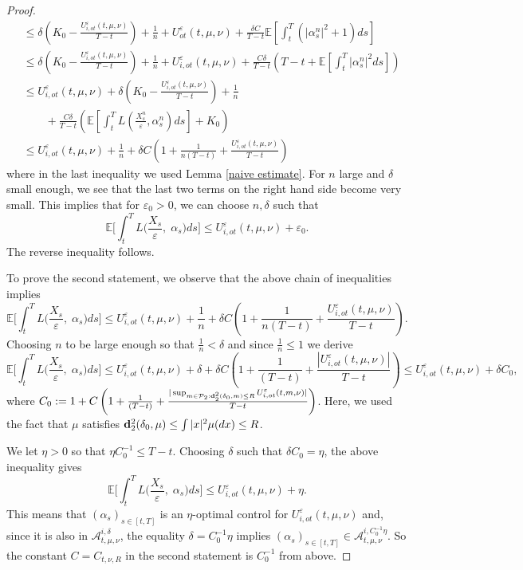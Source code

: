 \documentclass[reqno,11pt]{amsart}
\numberwithin{equation}{section}
\newcommand{\e}{\varepsilon}
\newcommand{\nd}{\noindent}
\begin{document}
\begin{proof}
\begin{align*}
        &\le \delta \left(K_0-\frac{U_{i,ot}^\e(t,\mu,\nu)}{T-t}\right)+\frac{1}{n}+U_{ot}^\e(t,\mu,\nu) +\frac{\delta C}{T-t}\mathbb{E}\left[ \int_t^T(|\alpha_s^n|^2+1)ds\right]\\
        &\le\delta \left(K_0-\frac{U_{i,ot}^\e(t,\mu,\nu)}{T-t}\right)+\frac{1}{n}+U_{i,ot}^\e(t,\mu,\nu) +\frac{C\delta}{T-t}\left(T-t+\mathbb{E}\left[\int_t^T|\alpha_s^n|^2ds\right]\right)\\
        &\le U_{i,ot}^\e(t,\mu,\nu)+\delta \left(K_0-\frac{U_{i,ot}^\e(t,\mu,\nu)}{T-t}\right)+\frac{1}{n}\\
        &\qquad+\frac{C\delta}{T-t}\left( \mathbb{E}\left[\int_t^TL\left( \frac{X_s^n}{\e},\alpha_s^n\right)ds\right]+K_0\right)\\
        &\le U_{i,ot}^\e(t,\mu,\nu)+\frac{1}{n}+\delta C\left(1+\frac{1}{n(T-t)}+\frac{U_{i,ot}^\e(t,\mu,\nu)}{T-t}\right)
    \end{align*}
    where in the last inequality we used Lemma \ref{naive estimate}. For $n$ large and $\delta$ small enough, we see that the last two terms on the right hand side become very small. This implies that for $\e_0>0$, we can choose $n,\delta$ such that
    $$\mathbb{E}\bigg[ \int_t^TL\big( \frac{X_s}{\e},\;\alpha_s\big)ds \bigg]\le U^\e_{i,ot}(t,\mu,\nu)+\e_0.$$
    The reverse inequality follows.
    \vspace{2mm}

    \nd
    To prove the second statement, we observe that the above chain of inequalities implies
    $$\mathbb{E}\bigg[ \int_t^TL\big( \frac{X_s}{\e},\;\alpha_s\big)ds \bigg]\le U_{i,ot}^\e(t,\mu,\nu)+\frac{1}{n}+\delta C\left(1+\frac{1}{n(T-t)}+\frac{U_{i,ot}^\e(t,\mu,\nu)}{T-t}\right).$$
    Choosing $n$ to be large enough so that $\frac{1}{n}<\delta$ and since $\frac{1}{n}\le 1$ we derive
    $$\mathbb{E}\bigg[ \int_t^TL\big( \frac{X_s}{\e},\;\alpha_s\big)ds \bigg]\le U_{i,ot}^\e(t,\mu,\nu)+\delta+\delta C\left(1+\frac{1}{(T-t)}+\frac{|U_{i,ot}^\e(t,\mu,\nu)|}{T-t}\right)\le U_{i,ot}^\e(t,\mu,\nu)+\delta C_0,$$
    where $C_0:=1+C\left(1+\frac{1}{(T-t)}+\frac{|\sup_{m\in\mathcal{P}_2:{\bf d}_2^2(\delta_0,m)\le R}U_{i,ot}^\e(t,m,\nu)|}{T-t}\right)$. Here, we used the fact that $\mu$ satisfies ${\bf d}_2^2(\delta_0,\mu)\le \int|x|^2\mu(dx)\le R$.
    \vspace{1mm}

    \nd
    We let $\eta>0$ so that $\eta C_0^{-1}\le T-t$. Choosing $\delta$ such that $\delta C_0=\eta$, the above inequality gives
    $$\mathbb{E}\bigg[ \int_t^TL\big( \frac{X_s}{\e},\;\alpha_s\big)ds \bigg]\le U_{i,ot}^\e(t,\mu,\nu)+\eta.$$
    This means that $(\alpha_s)_{s\in [t,T]}$ is an $\eta$-optimal control for $U^\e_{i,ot}(t,\mu,\nu)$ and, since it is also in $\mathcal{A}_{t,\mu,\nu}^{i,\delta}$, the equality $\delta=C_0^{-1}\eta$ implies $(\alpha_s)_{s\in [t,T]}\in \mathcal{A}_{t,\mu,\nu}^{i, C_0^{-1}\eta}$. So the constant $C=C_{t,\nu,R}$ in the second statement is $C_0^{-1}$ from above.
\end{proof}
\end{document}
